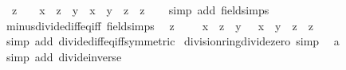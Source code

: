 \begin{isabellebody}
\ \ {\isachardoublequoteopen}z\ {\isasymnoteq}\ {}\ {\isasymLongrightarrow}\ x\ {\isacharslash}{\kern0pt}\ z\ {\isacharminus}{\kern0pt}\ y\ {\isacharequal}{\kern0pt}\ {\isacharparenleft}{\kern0pt}x\ {\isacharminus}{\kern0pt}\ y\ {\isacharasterisk}{\kern0pt}\ z{\isacharparenright}{\kern0pt}\ {\isacharslash}{\kern0pt}\ z{\isachardoublequoteclose}\isanewline
%
\isadelimproof
\ \ %
\endisadelimproof
%
\isatagproof
{}\isamarkupfalse%
\ {\isacharparenleft}{\kern0pt}simp\ add{\isacharcolon}{\kern0pt}\ field{\isacharunderscore}{\kern0pt}simps{\isacharparenright}{\kern0pt}%
\endisatagproof
{\isafoldproof}%
%
\isadelimproof
\isanewline
%
\endisadelimproof
\isanewline
{}\isamarkupfalse%
\ minus{\isacharunderscore}{\kern0pt}divide{\isacharunderscore}{\kern0pt}diff{\isacharunderscore}{\kern0pt}eq{\isacharunderscore}{\kern0pt}iff\ {\isacharbrackleft}{\kern0pt}field{\isacharunderscore}{\kern0pt}simps{\isacharbrackright}{\kern0pt}{\isacharcolon}{\kern0pt}\isanewline
\ \ {\isachardoublequoteopen}z\ {\isasymnoteq}\ {}\ {\isasymLongrightarrow}\ {\isacharminus}{\kern0pt}\ {\isacharparenleft}{\kern0pt}x\ {\isacharslash}{\kern0pt}\ z{\isacharparenright}{\kern0pt}\ {\isacharminus}{\kern0pt}\ y\ {\isacharequal}{\kern0pt}\ {\isacharparenleft}{\kern0pt}{\isacharminus}{\kern0pt}\ x\ {\isacharminus}{\kern0pt}\ y\ {\isacharasterisk}{\kern0pt}\ z{\isacharparenright}{\kern0pt}\ {\isacharslash}{\kern0pt}\ z{\isachardoublequoteclose}\isanewline
%
\isadelimproof
\ \ %
\endisadelimproof
%
\isatagproof
{}\isamarkupfalse%
\ {\isacharparenleft}{\kern0pt}simp\ add{\isacharcolon}{\kern0pt}\ divide{\isacharunderscore}{\kern0pt}diff{\isacharunderscore}{\kern0pt}eq{\isacharunderscore}{\kern0pt}iff{\isacharbrackleft}{\kern0pt}symmetric{\isacharbrackright}{\kern0pt}{\isacharparenright}{\kern0pt}%
\endisatagproof
{\isafoldproof}%
%
\isadelimproof
\isanewline
%
\endisadelimproof
\isanewline
{}\isamarkupfalse%
\ division{\isacharunderscore}{\kern0pt}ring{\isacharunderscore}{\kern0pt}divide{\isacharunderscore}{\kern0pt}zero\ {\isacharbrackleft}{\kern0pt}simp{\isacharbrackright}{\kern0pt}{\isacharcolon}{\kern0pt}\isanewline
\ \ {\isachardoublequoteopen}a\ {\isacharslash}{\kern0pt}\ {}\ {\isacharequal}{\kern0pt}\ {}{\isachardoublequoteclose}\isanewline
%
\isadelimproof
\ \ %
\endisadelimproof
%
\isatagproof
{}\isamarkupfalse%
\ {\isacharparenleft}{\kern0pt}simp\ add{\isacharcolon}{\kern0pt}\ divide{\isacharunderscore}{\kern0pt}inverse{\isacharparenright}{\kern0pt}%
\endisatagproof
{\isafoldproof}%

\end{isabellebody}
